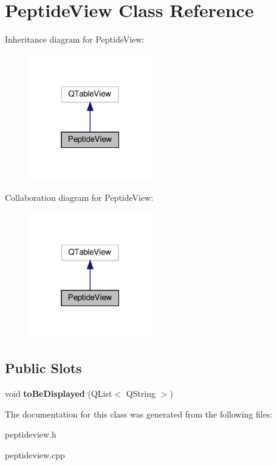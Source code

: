 \hypertarget{class_peptide_view}{}\section{Peptide\+View Class Reference}
\label{class_peptide_view}


Inheritance diagram for Peptide\+View\+:\nopagebreak
\begin{figure}[H]
\begin{center}
\leavevmode
\includegraphics[width=151pt]{class_peptide_view__inherit__graph}
\end{center}
\end{figure}


Collaboration diagram for Peptide\+View\+:\nopagebreak
\begin{figure}[H]
\begin{center}
\leavevmode
\includegraphics[width=151pt]{class_peptide_view__coll__graph}
\end{center}
\end{figure}
\subsection*{Public Slots}
\begin{DoxyCompactItemize}
\item 
\mbox{\label{class_peptide_view_a44ff37ec18e1e1c61c8747b6fe79e076}} 
void {\bfseries to\+Be\+Displayed} (Q\+List$<$ Q\+String $>$)
\end{DoxyCompactItemize}


The documentation for this class was generated from the following files\+:\begin{DoxyCompactItemize}
\item 
peptideview.\+h\item 
peptideview.\+cpp\end{DoxyCompactItemize}
